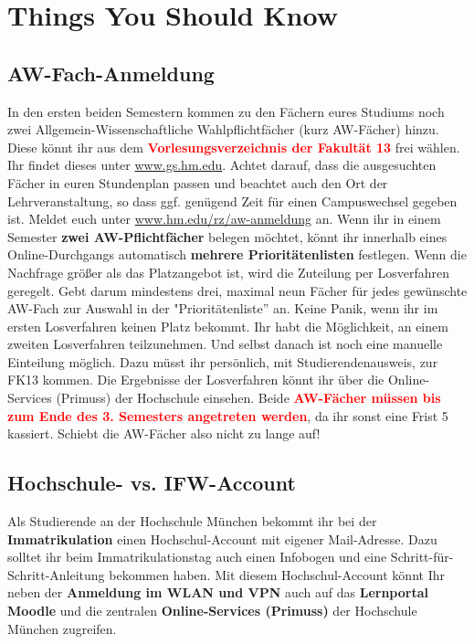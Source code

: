 \section{Things You Should Know}

\subsection{AW-Fach-Anmeldung}

In den ersten beiden Semestern kommen zu den Fächern eures Studiums noch zwei Allgemein-Wissenschaftliche Wahlpflichtfächer (kurz AW-Fächer) hinzu. Diese könnt ihr aus dem \textcolor{red}{\textbf{Vorlesungsverzeichnis der Fakultät 13}} frei wählen. Ihr findet dieses unter \url{www.gs.hm.edu}. Achtet darauf, dass die ausgesuchten Fächer in euren Stundenplan passen und beachtet auch den Ort der Lehrveranstaltung, so dass ggf. genügend Zeit für einen Campuswechsel gegeben ist.\doublebreak
Meldet euch unter \url{www.hm.edu/rz/aw-anmeldung} an.\doublebreak
Wenn ihr in einem Semester \textbf{zwei AW-Pflichtfächer} belegen möchtet, könnt ihr innerhalb eines Online-Durchgangs automatisch \textbf{mehrere Prioritätenlisten} festlegen. Wenn die Nachfrage größer als das Platzangebot ist, wird die Zuteilung per Losverfahren geregelt. Gebt darum mindestens drei, maximal neun Fächer für jedes gewünschte AW-Fach zur Auswahl in der "Prioritätenliste'' an. Keine Panik, wenn ihr im ersten Losverfahren keinen Platz bekommt. Ihr habt die Möglichkeit, an einem zweiten Losverfahren teilzunehmen. Und selbst danach ist noch eine manuelle Einteilung möglich. Dazu müsst ihr persönlich, mit Studierendenausweis, zur FK13 kommen.\doublebreak
Die Ergebnisse der Losverfahren könnt ihr über die Online-Services (Primuss) der Hochschule einsehen.\doublebreak
Beide \textcolor{red}{\textbf{AW-Fächer müssen bis zum Ende des 3. Semesters angetreten werden}}, da ihr sonst eine Frist 5 kassiert. Schiebt die AW-Fächer also nicht zu lange auf! 

\subsection{Hochschule- vs. IFW-Account}

Als Studierende an der Hochschule München bekommt ihr bei der \textbf{Immatrikulation} einen Hochschul-Account mit eigener Mail-Adresse. Dazu solltet ihr beim Immatrikulationstag auch einen Infobogen und eine Schritt-für-Schritt-Anleitung bekommen haben.\doublebreak
Mit diesem Hochschul-Account könnt Ihr neben der \textbf{Anmeldung im WLAN und VPN} auch auf das \textbf{Lernportal Moodle} und die zentralen \textbf{Online-Services (Primuss)} der Hochschule München zugreifen.


